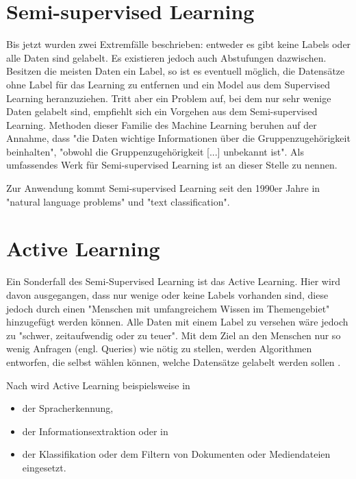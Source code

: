 \section{Semi-supervised Learning}\label{sec:ssl1}
Bis jetzt wurden zwei Extremfälle beschrieben: entweder es gibt keine Labels oder alle Daten sind gelabelt. Es existieren jedoch auch Abstufungen dazwischen. Besitzen die meisten Daten ein Label, so ist es eventuell möglich, die Datensätze ohne Label für das Learning zu entfernen und ein Model aus dem Supervised Learning heranzuziehen. Tritt aber ein Problem auf, bei dem nur sehr wenige Daten gelabelt sind, empfiehlt sich ein Vorgehen aus dem Semi-supervised Learning. Methoden dieser Familie des Machine Learning beruhen auf der Annahme, dass "die Daten wichtige Informationen über die Gruppenzugehörigkeit beinhalten", "obwohl die Gruppenzugehörigkeit [...] unbekannt ist"\citep[S.~223; eigene Übersetzung]{ramasubramanian_machine_2017}. Als umfassendes Werk für Semi-supervised Learning ist an dieser Stelle \citep{chapelle_semi-supervised_2006} zu nennen. \par
Zur Anwendung kommt Semi-supervised Learning seit den 1990er Jahre in "natural language problems" und "text classification"\citep[S.~4]{chapelle_semi-supervised_2006}.

\section{Active Learning}\label{sec:al1}
Ein Sonderfall des Semi-Supervised Learning ist das Active Learning. Hier wird davon ausgegangen, dass nur wenige oder keine Labels vorhanden sind, diese jedoch durch einen "Menschen mit umfangreichem Wissen im Themengebiet"\citep[S.~i; eigene Übersetzung]{olsson_literature_2009} hinzugefügt werden können. Alle Daten mit einem Label zu versehen wäre jedoch zu "schwer, zeitaufwendig oder zu teuer"\citep[Abstract; eigene Übersetzung]{settles_active_2010}. Mit dem Ziel an den Menschen nur so wenig Anfragen (engl. Queries) wie nötig zu stellen\citep[Abstract]{olsson_literature_2009}, werden Algorithmen entworfen, die selbst wählen können, welche Datensätze gelabelt werden sollen \citep[Abstract]{settles_active_2010}.\par
Nach \citep[S.~4]{settles_active_2010} wird Active Learning beispielsweise in
\begin{itemize}
\item der Spracherkennung,
\item der Informationsextraktion oder in
\item der Klassifikation oder dem Filtern von Dokumenten oder Mediendateien eingesetzt.
\end{itemize}

